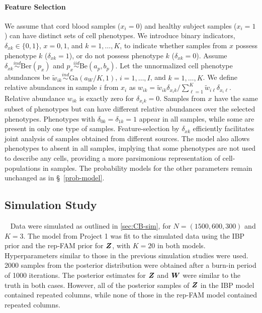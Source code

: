 \documentclass[12pt,]{article}
\newcommand{\iid}{\overset{iid}{\sim}}
\newcommand{\ind}{\overset{ind}{\sim}}
\def\G{\text{Ga}}
\def\Ber{\text{Ber}}
\def\Be{\text{Be}}
\newcommand{\bZ}{\mbox{\boldmath $Z$}}
\newcommand{\bW}{\mbox{\boldmath $W$}}
\begin{document}
\paragraph*{Feature Selection} We assume that cord blood samples ($x_i=0$) and
healthy subject samples ($x_i=1$) can have distinct sets of cell phenotypes.
We introduce binary indicators, $\delta_{xk}\in \{0, 1\}$, $x=0,1$, and
$k=1,\ldots, K$, to indicate whether samples from $x$ possess phenotype $k$
($\delta_{xk}=1$), or do not possess phenotype $k$ ($\delta_{xk}=0$). Assume
$\delta_{xk} \ind \Ber(p_{x})$ and $p_x \iid \Be(a_p, b_p)$.  Let the unnormalized
cell phenotype abundances be $\tilde w_{ik} \ind \G(a_W/K, 1)$, $i=1, \ldots, I$,
and $k=1, \ldots, K$. We define relative abundances in sample $i$ from
$x_i$ as 
$
w_{ik} =\tilde w_{ik} \delta_{x_i k}/\sum_{\ell=1}^K\tilde w_{i\ell} \delta_{x_i \ell}.
$
Relative abundance $w_{ik}$ is exactly zero for $\delta_{x_ik}=0$. Samples
from $x$ have the same subset of phenotypes but can have different relative
abundances over the selected phenotypes. Phenotypes with
$\delta_{0k}=\delta_{1k}=1$ appear in all samples, while some are present in only
one type of samples. Feature-selection by $\delta_{xk}$ efficiently facilitates
joint analysis of samples obtained from different sources. The model also
allows phenotypes to absent in all samples, implying that some phenotypes are not
used to describe any cells, providing a more parsimonious representation of 
cell-populations in samples. The probability models for the other parameters
remain unchanged as in \S~\ref{prob-model}.  



\subsection{Simulation Study}~\label{sec:rep-sim}
Data were simulated as outlined in \ref{sec:CB-sim}, for $N=(1500, 600, 300)$
and $K=3$. The model from Project 1 was fit to the simulated data using the IBP
prior and the rep-FAM prior for $\bZ$, with $K=20$ in both models.
Hyperparameters similar to those in the previous simulation studies were used.
2000 samples from the posterior distribution were obtained after a burn-in
period of 1000 iterations.  The posterior estimates for $\bZ$ and $\bW$ were
similar to the truth in both cases.  However, all of the posterior samples of
$\bZ$ in the IBP model contained repeated columns, while none of those in the
rep-FAM model contained repeated columns. 
\end{document}
